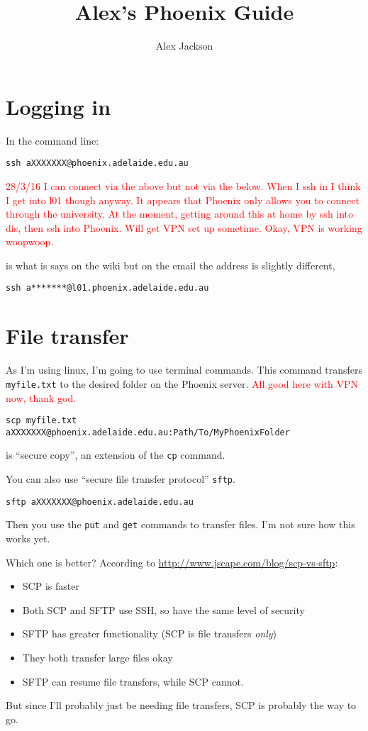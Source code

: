 \documentclass[a4]{article}
\title{Alex's Phoenix Guide}
\author{Alex Jackson}
\begin{document}
\maketitle

\section{Logging in}
In the command line:
\begin{lstlisting}
ssh aXXXXXXX@phoenix.adelaide.edu.au
\end{lstlisting}
\textcolor{red}{28/3/16 I can connect via the above but not via the below. When I ssh in I think I get into l01 though anyway. It appears that Phoenix only allows you to connect through the university. At the moment, getting around this at home by ssh into dis, then ssh into Phoenix. Will get VPN set up sometime. Okay, VPN is working woopwoop.}

is what is says on the wiki but on the email the address is slightly different,
\begin{lstlisting}
ssh a*******@l01.phoenix.adelaide.edu.au
\end{lstlisting}

\section{File transfer}
As I'm using linux, I'm going to use terminal commands. This command transfers \texttt{myfile.txt} to the desired folder on the Phoenix server. \textcolor{red}{All good here with VPN now, thank god.}
\begin{lstlisting}
scp myfile.txt aXXXXXXX@phoenix.adelaide.edu.au:Path/To/MyPhoenixFolder
\end{lstlisting}
is ``secure copy'', an extension of the \texttt{cp} command.

You can also use ``secure file transfer protocol'' \texttt{sftp}. 
\begin{lstlisting}
sftp aXXXXXXX@phoenix.adelaide.edu.au
\end{lstlisting}
Then you use the \texttt{put} and \texttt{get} commands to transfer files. I'm not sure how this works yet.

Which one is better? According to \url{http://www.jscape.com/blog/scp-vs-sftp}:
\begin{itemize}
  \item SCP is faster
  \item Both SCP and SFTP use SSH, so have the same level of security
  \item SFTP has greater functionality (SCP is file transfers \emph{only})
  \item They both transfer large files okay
  \item SFTP can resume file transfers, while SCP cannot.
\end{itemize} 
But since I'll probably just be needing file transfers, SCP is probably the way to go.
\end{document}
